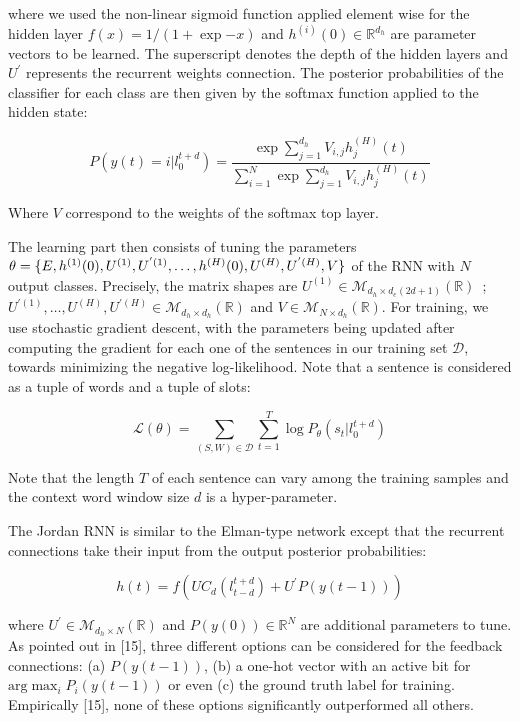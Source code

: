 where we used the non-linear sigmoid function applied element wise for the
hidden layer $f(x)=1/(1+\exp{-x})$ and $h^{(i)} (0)\in\mathbb{R}^{d_h}$ are parameter vectors
to be learned. The superscript denotes the depth of the hidden layers and $U^{'}$
represents the recurrent weights connection. The posterior probabilities of the
classifier for each class are then given by the softmax function applied to the
hidden state:

\begin{equation}
P(y(t) = i \vert l_{0}^{t+d}) = \frac{\exp{\sum_{j=1}^{d_{h}}}V_{i,j}h_{j}^{(H)}(t)}{\sum_{i=1}^{N}\exp{\sum_{j=1}^{d_{h}}}V_{i,j}h_{j}^{(H)}(t)}
\end{equation}

Where $V$ correspond to the weights of the softmax top layer. 

The learning part then consists of tuning the parameters $\theta=\{ E, h^{(1)}
(0), U^{(1)}, \\ U^{'(1)},\dots,h^{(H)} (0), U^{(H)}, U^{'(H)} ,V \}$   of the RNN with $N$
output classes. Precisely, the matrix shapes are $U^{(1)}\in\mathcal{M}_{d_h\times d_e (2d+1)}
(\mathbb{R})$~;~ $U^{'(1)},\dots,U^{(H)}, U^{'(H)}\in\mathcal{M}_{d_h\times d_h} (\mathbb{R})$ and $V\in\mathcal{M}_{N\times d_h}(\mathbb{R})$. For
training, we use stochastic gradient descent, with the parameters being updated
after computing the gradient for each one of the sentences in our training set
$\mathcal{D}$, towards minimizing the negative log-likelihood. Note that a sentence is
considered as a tuple of words and a tuple of slots:

\begin{equation}
\mathcal{L}(\theta) = \sum_{(S,W)\in\mathcal{D}} \sum_{t=1}^{T}\log P_{\theta}(s_{t}\vert l_{0}^{t+d})
\end{equation}

Note that the length $T$ of each sentence can vary among the training samples and
the context word window size $d$ is a hyper-parameter.  

The Jordan RNN is similar to the Elman-type network except that the recurrent
connections take their input from the output posterior probabilities:

\begin{equation}
h(t) = f(UC_{d}(l^{t+d}_{t-d})+ U^{'}P(y(t-1)))
\end{equation}


where $U^{'}\in\mathcal{M}_{d_h\times N} (\mathbb{R})$ and
$P(y(0))\in\mathbb{R}^{N}$ are additional parameters to tune. As pointed out in
[15], three different options can be considered for the feedback connections:
(a) $P(y(t-1))$, (b) a one-hot vector with an active bit for $\textrm{arg}
\max_i P_i(y(t-1))$ or even (c) the ground truth label for training.
Empirically [15], none of these options significantly outperformed all others.  

